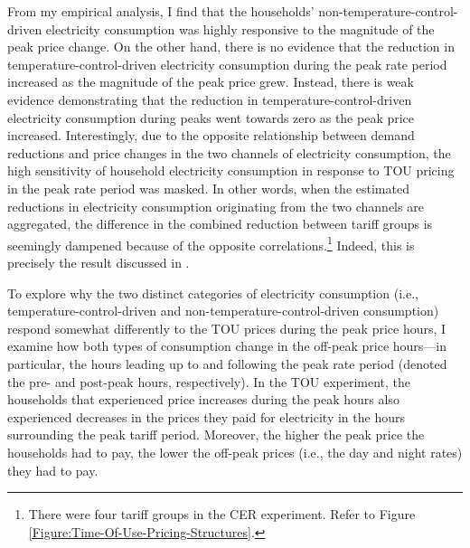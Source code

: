From my empirical analysis, I find that the households' non-temperature-control-driven electricity consumption was highly responsive to the magnitude of the peak price change. On the other hand, there is no evidence that the reduction in temperature-control-driven electricity consumption during the peak rate period increased as the magnitude of the peak price grew. Instead, there is weak evidence demonstrating that the reduction in temperature-control-driven electricity consumption during peaks went towards zero as the peak price increased. Interestingly, due to the opposite relationship between demand reductions and price changes in the two channels of electricity consumption, the high sensitivity of household electricity consumption in response to TOU pricing in the peak rate period was masked. In other words, when the estimated reductions in electricity consumption originating from the two channels are aggregated, the difference in the combined reduction between tariff groups is seemingly dampened because of the opposite correlations.\footnote{There were four tariff groups in the CER experiment. Refer to Figure \ref{Figure:Time-Of-Use-Pricing-Structures}.} Indeed, this is precisely the result discussed in \cite{Peaking-Interest:How-Awareness-Drives-the-Effectiveness-of-Time-of-Use-Electricity-Pricing_Prest_2020}. 

To explore why the two distinct categories of electricity consumption (i.e., temperature-control-driven and non-temperature-control-driven consumption) respond somewhat differently to the TOU prices during the peak price hours, I examine how both types of consumption change in the off-peak price hours---in particular, the hours leading up to and following the peak rate period (denoted the pre- and post-peak hours, respectively). In the TOU experiment, the households that experienced price increases during the peak hours also experienced decreases in the prices they paid for electricity in the hours surrounding the peak tariff period. Moreover, the higher the peak price the households had to pay, the lower the off-peak prices (i.e., the day and night rates) they had to pay. 

